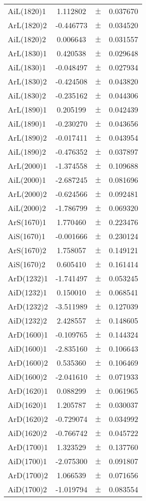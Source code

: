 \begin{table}
\begin{tiny}
\begin{tabular}{lccc}
AiL(1820)1 & 1.112802 & $\pm$ & 0.037670 \\
ArL(1820)2 & -0.446773 & $\pm$ & 0.034520 \\
AiL(1820)2 & 0.006643 & $\pm$ & 0.031557 \\
ArL(1830)1 & 0.420538 & $\pm$ & 0.029648 \\
AiL(1830)1 & -0.048497 & $\pm$ & 0.027934 \\
ArL(1830)2 & -0.424508 & $\pm$ & 0.043820 \\
AiL(1830)2 & -0.235162 & $\pm$ & 0.044306 \\
ArL(1890)1 & 0.205199 & $\pm$ & 0.042439 \\
AiL(1890)1 & -0.230270 & $\pm$ & 0.043656 \\
ArL(1890)2 & -0.017411 & $\pm$ & 0.043954 \\
AiL(1890)2 & -0.476352 & $\pm$ & 0.037897 \\
ArL(2000)1 & -1.374558 & $\pm$ & 0.109688 \\
AiL(2000)1 & -2.687245 & $\pm$ & 0.081696 \\
ArL(2000)2 & -0.624566 & $\pm$ & 0.092481 \\
AiL(2000)2 & -1.786799 & $\pm$ & 0.069320 \\
ArS(1670)1 & 1.770460 & $\pm$ & 0.223476 \\
AiS(1670)1 & -0.001666 & $\pm$ & 0.230124 \\
ArS(1670)2 & 1.758057 & $\pm$ & 0.149121 \\
AiS(1670)2 & 0.605410 & $\pm$ & 0.161414 \\
ArD(1232)1 & -1.741497 & $\pm$ & 0.053245 \\
AiD(1232)1 & 0.150010 & $\pm$ & 0.068541 \\
ArD(1232)2 & -3.511989 & $\pm$ & 0.127039 \\
AiD(1232)2 & 2.428557 & $\pm$ & 0.148605 \\
ArD(1600)1 & -0.109765 & $\pm$ & 0.144324 \\
AiD(1600)1 & -2.835160 & $\pm$ & 0.106643 \\
ArD(1600)2 & 0.535360 & $\pm$ & 0.106469 \\
AiD(1600)2 & -2.041610 & $\pm$ & 0.071933 \\
ArD(1620)1 & 0.088299 & $\pm$ & 0.061965 \\
AiD(1620)1 & 1.205787 & $\pm$ & 0.030037 \\
ArD(1620)2 & -0.729074 & $\pm$ & 0.034992 \\
AiD(1620)2 & -0.766742 & $\pm$ & 0.045722 \\
ArD(1700)1 & 1.323529 & $\pm$ & 0.137760 \\
AiD(1700)1 & -2.075300 & $\pm$ & 0.091807 \\
ArD(1700)2 & 1.066539 & $\pm$ & 0.071656 \\
AiD(1700)2 & -1.019794 & $\pm$ & 0.083554 \\
\bottomrule
\end{tabular}
\end{tiny}
\end{table}

